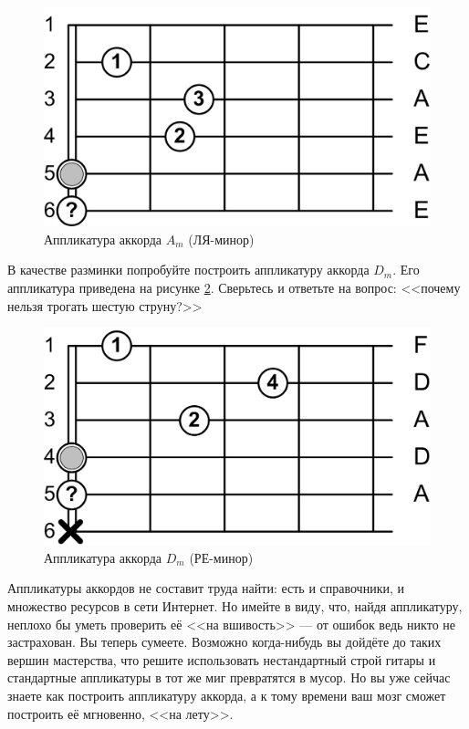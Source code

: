 \begin{figure}[!ht]
    \centering
    \includegraphics{fig/chords/Am} 
    \caption{Аппликатура аккорда $A_m$ (ЛЯ-минор)}\label{fig:harmony:chords:Am}
\end{figure} 

В качестве разминки попробуйте построить аппликатуру аккорда $D_m$. Его аппликатура приведена на рисунке \ref{fig:harmony:chords:Dm}. Сверьтесь и ответьте на вопрос: <<почему нельзя трогать шестую струну?>>

\begin{figure}[!ht]
    \centering
    \includegraphics{fig/chords/Dm} 
    \caption{Аппликатура аккорда $D_m$ (РЕ-минор)}\label{fig:harmony:chords:Dm}
\end{figure} 

Аппликатуры аккордов не составит труда найти: есть и справочники, и множество ресурсов в сети Интернет. Но имейте в виду, что, найдя аппликатуру, неплохо бы уметь проверить её <<на вшивость>> --- от ошибок ведь никто не застрахован. Вы теперь сумеете. Возможно когда-нибудь вы дойдёте до таких вершин мастерства, что решите использовать нестандартный строй гитары и стандартные аппликатуры в тот же миг превратятся в мусор. Но вы уже сейчас знаете как построить аппликатуру аккорда, а к тому времени ваш мозг сможет построить её мгновенно, <<на лету>>.

